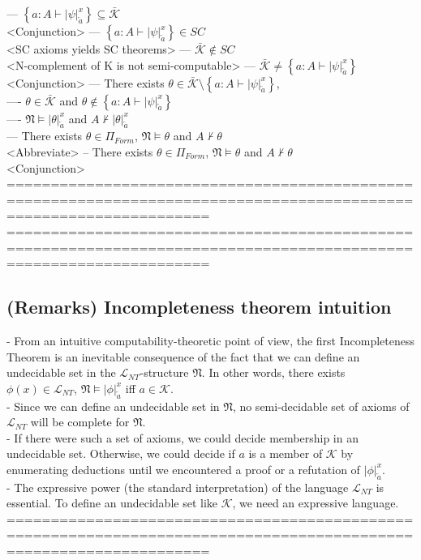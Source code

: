 \documentclass{book}
\newcommand{\inot}{\not}
\newcommand{\set}[1]{\left\{ #1 \right\}}
\newcommand{\sub}[3]{\left|#1\right|_{#3}^{#2}}
\begin{document}
			--- $\set{a: A \vdash \sub{\psi}{x}{\overleftarrow{a}}} \subseteq \bar{\mathcal{K}}$ \\ <Conjunction>
			--- $\set{a: A \vdash \sub{\psi}{x}{\overleftarrow{a}}} \in SC$ \\ <SC axioms yields SC theorems>
			--- $\bar{\mathcal{K}} \inot \in SC$ \\ <N-complement of K is not semi-computable>
			--- $\bar{\mathcal{K}} \inot = \set{a: A \vdash \sub{\psi}{x}{\overleftarrow{a}}}$ \\ <Conjunction>
			--- There exists $\theta \in \bar{\mathcal{K}} \setminus \set{a: A \vdash \sub{\psi}{x}{\overleftarrow{a}}}$, \\
				---- $\theta \in \bar{\mathcal{K}}$ and $\theta \inot \in \set{a: A \vdash \sub{\psi}{x}{\overleftarrow{a}}}$ \\
				---- $\mathfrak{N} \vDash \sub{\theta}{x}{\overleftarrow{a}}$ and $A \inot \vdash \sub{\theta}{x}{\overleftarrow{a}}$ \\
			--- There exists $\theta \in \Pi_{Form}$, $\mathfrak{N} \vDash \theta$ and $A \inot \vdash \theta$ \\ <Abbreviate>
		-- There exists $\theta \in \Pi_{Form}$, $\mathfrak{N} \vDash \theta$ and $A \inot \vdash \theta$ \\ <Conjunction>
	===================================================================================================================
	===================================================================================================================
\subsection{(Remarks) Incompleteness theorem intuition} %
	- From an intuitive computability-theoretic point of view, the first Incompleteness Theorem is an inevitable consequence of the fact that we can define an undecidable set in the $\mathcal{L}_{NT}$-structure $\mathfrak{N}$. In other words, there exists $\phi(x) \in \mathcal{L}_{NT}$, $\mathfrak{N} \vDash \sub{\phi}{x}{\overleftarrow{a}}$ iff $a \in \mathcal{K}$. \\
	- Since we can define an undecidable set in $\mathfrak{N}$, no semi-decidable set of axioms of $\mathcal{L}_{NT}$ will be complete for $\mathfrak{N}$. \\
	- If there were such a set of axioms, we could decide membership in an undecidable set. Otherwise, we could decide if $a$ is a member of $\mathcal{K}$ by enumerating deductions until we encountered a proof or a refutation of $\sub{\phi}{x}{\overleftarrow{a}}$. \\
	- The expressive power (the standard interpretation) of the language $\mathcal{L}_{NT}$ is essential. To define an undecidable set like $\mathcal{K}$, we need an expressive language. \\
	===================================================================================================================
\end{document}
